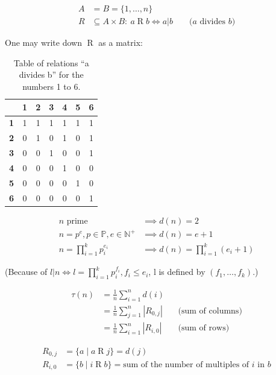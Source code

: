 \begin{align*}
  A &= B = \{1,\ldots,n\} \\
  R & \subseteq A\times B :\ a\operatorname{R} b\iff a|b && \text{ ($a$ divides $b$)}
\end{align*}
\bigskip

One may write down $\operatorname{R}$ as a matrix:

\begin{table}[H]
  \begin{center}
    \begin{tabular}{l|cccccc}
      & \textbf{1} & \textbf{2} & \textbf{3} & \textbf{4} & \textbf{5} & \textbf{6} \\
      \hline \textbf{1} & 1 & 1 & 1 & 1 &  1 & 1 \\
      \textbf{2} & 0 & 1 & 0 & 1 &  0 & 1 \\
      \textbf{3} & 0 & 0 & 1 & 0 &  0 & 1 \\
      \textbf{4} & 0 & 0 & 0 & 1 &  0 & 0 \\
      \textbf{5} & 0 & 0 & 0 & 0 &  1 & 0 \\
      \textbf{6} & 0 & 0 & 0 & 0 &  0 & 1
    \end{tabular}
    \caption{Table of relations ``a divides b'' for the numbers 1 to 6.}
  \end{center}
\end{table}

\begin{align*}
  \text{$n$ prime}
    &\implies d(n) = 2 \\
  n = p^e, p\in \mathbb{P}, e\in \mathbb{N}^{+}
    &\implies d(n) = e+1 \\
  n = \prod_{i=1}^k p_i^{e_i}
    &\implies d(n) = \prod_{i=1}^k (e_i+1)
\end{align*}

(Because of $l | n \iff l = \prod_{i=1}^k p_i^{f_i},
f_i ≤ e_i$, l is defined by $(f_1,\ldots,f_k)$.)

\begin{align*}
  \tau(n) &= \frac{1}{n}\sum_{i=1}^n d(i)\\
    &= \frac{1}{n}\sum_{j=1}^n |R_{0,j}| && \text{(sum of columns)} \\
    &= \frac{1}{n}\sum_{i=1}^n |R_{i,0}| && \text{(sum of rows)}
\end{align*}

\begin{align*}
  R_{0,j} &= \{a \mid a \operatorname{R} j\} = d(j) \\
  R_{i,0} &= \{b \mid i\operatorname{R} b\}
    = \text{sum of the number of multiples of $i$ in $b$}
\end{align*}

